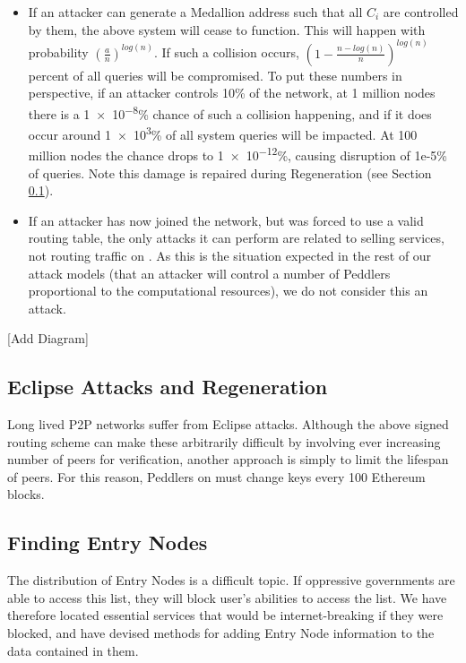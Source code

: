 \begin{itemize}
\item If an attacker can generate a Medallion address such that all $C_i$ are controlled by them, the above system will cease to function. This will happen with probability $(\frac{a}{n})^{log(n)}$. If such a collision occurs, $(1 - \frac{n-log(n)}{n})^{log(n)}$ percent of all queries will be compromised. To put these numbers in perspective, if an attacker controls 10\% of the network, at 1 million nodes there is a \num{1e-8}\% chance of such a collision happening, and if it does occur around \num{1e3}\% of all system queries will be impacted. At 100 million nodes the chance drops to \num{1e-12}\%, causing disruption of 1e-5\% of queries. Note this damage is repaired during Regeneration (see Section \ref{market-regen}).
\item If an attacker has now joined the network, but was forced to use a valid routing table, the only attacks it can perform are related to selling services, not routing traffic on \tOM{}. As this is the situation expected in the rest of our attack models (that an attacker will control a number of Peddlers proportional to the computational resources), we do not consider this an attack.
\end{itemize}
{\color{red}[Add Diagram]}

\subsection{Eclipse Attacks and Regeneration}
\label{market-regen}

Long lived P2P networks suffer from Eclipse attacks. Although the
above signed routing scheme can make these arbitrarily difficult by
involving ever increasing number of peers for verification, another
approach is simply to limit the lifespan of peers. For this reason,
Peddlers on \tOM{} must change keys every 100 Ethereum blocks.



\subsection{Finding Entry Nodes}
\label{bootstrapping}

The distribution of Entry Nodes is a difficult topic. If oppressive governments are able to access this list, they will block user's abilities to access the list. We have therefore located essential services that would be internet-breaking if they were blocked, and have devised methods for adding Entry Node information to the data contained in them.

